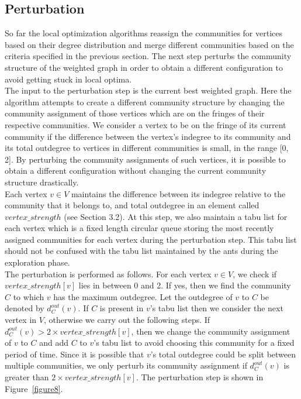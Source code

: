 \begin{spacing}{1.5}
\subsection{Perturbation}
So far the local optimization algorithms reassign the communities for vertices based on their degree distribution and merge different communities based on the criteria specified in the previous section. The next step perturbs the community structure of the weighted graph in order to obtain a different configuration to avoid getting stuck in local optima.\\
\indent The input to the perturbation step is the current best weighted graph. Here the algorithm attempts to create a different community structure by changing the community assignment of those vertices which are on the fringes of their respective communities. We consider a vertex to be on the fringe of its current community if the difference between the vertex's indegree to its community and its total outdegree to vertices in different communities is small, in the range [0, 2]. By perturbing the community assignments of such vertices, it is possible to obtain a different configuration without changing the current community structure drastically.\\
\indent Each vertex $v\in V$ maintains the difference between its indegree relative to the community that it belongs to, and total outdegree in an element called $vertex\_strength$ (see Section 3.2). At this step, we also maintain a tabu list for each vertex which is a fixed length circular queue storing the most recently assigned communities for each vertex during the perturbation step. This tabu list should not be confused with the tabu list maintained by the ants during the exploration phase.\\
\indent The perturbation is performed as follows. For each vertex $v\in V$, we check if $vertex\_strength[v]$ lies in between 0 and 2. If yes, then we find the community $C$ to which $v$ has the maximum outdegree. Let the outdegree of $v$ to $C$ be denoted by $d_C^{out}(v)$. If $C$ is present in $v$'s tabu list then we consider the next vertex in $V$, otherwise we carry out the following steps. If $d_C^{out}(v) > 2\times vertex\_strength[v]$, then we change the community assignment of $v$ to $C$ and add $C$ to $v$'s tabu list to avoid choosing this community for a fixed period of time. Since it is possible that $v$'s total outdegree could be split between multiple communities, we only perturb its community assignment if $d_C^{out}(v)$ is greater than $2\times vertex\_strength[v]$. The perturbation step is shown in Figure~\ref{figure8}.\\

\end{spacing}
